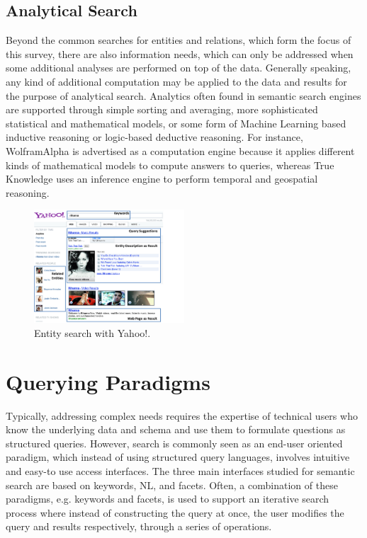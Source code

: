  
	
\subsection{Analytical Search}
Beyond the common searches for entities and relations, which form the focus of this survey, there are also information needs, which can only be addressed when some additional analyses are performed on top of the data. Generally speaking, any kind of additional computation may be applied to the data and results for the purpose of analytical search. Analytics often found in semantic search engines are supported through simple sorting and averaging, more sophisticated statistical and mathematical models, or some form of Machine Learning based inductive reasoning or logic-based deductive reasoning. For instance, WolframAlpha is advertised as a computation engine because it applies different kinds of mathematical models to compute answers to queries, whereas True Knowledge uses an inference engine to perform temporal and geospatial reasoning. 



\begin{figure}
	\centering
		\includegraphics[width=0.5\textwidth]{figs/screenshot_yahoo}
	\caption{Entity search with Yahoo!.}
	\label{fig:screenshot_yahoo}
\end{figure}


\section{Querying Paradigms}\label{sec:querying}
Typically, addressing complex needs requires the expertise of technical users who know the underlying data and schema and use them to formulate questions as structured queries. However, search is commonly seen as an end-user oriented paradigm, which instead of using structured query languages, involves intuitive and easy-to use access interfaces. The three main interfaces studied for semantic search are based on keywords, NL, and facets. Often, a combination of these paradigms, e.g. keywords and facets, is used to support an iterative search process where instead of constructing the query at once, the user modifies the query and results respectively, through a series of operations.    


